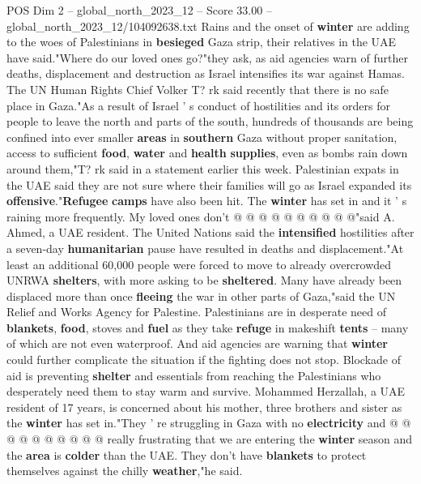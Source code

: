 \begin{textsample}{POS Dim 2 – global\_north\_2023\_12 – Score 33.00 – global\_north\_2023\_12/104092638.txt}  \label{ex:f2_pos_116}
Rains and the onset of \textbf{winter} are adding to the woes of Palestinians in \textbf{besieged} Gaza strip, their relatives in the UAE have said."Where do our loved ones go?"they ask, as aid agencies warn of further deaths, displacement and destruction as Israel intensifies its war against Hamas.
The UN Human Rights Chief Volker T? rk said recently that there is no safe place in Gaza."As a result of Israel ' s conduct of hostilities and its orders for people to leave the north and parts of the south, hundreds of thousands are being confined into ever smaller \textbf{areas} in \textbf{southern} Gaza without proper sanitation, access to sufficient \textbf{food}, \textbf{water} and \textbf{health} \textbf{supplies}, even as bombs rain down around them,"T? rk said in a statement earlier this week.
Palestinian expats in the UAE said they are not sure where their families will go as Israel expanded its \textbf{offensive}."\textbf{Refugee} \textbf{camps} have also been hit.
The \textbf{winter} has set in and it ' s raining more frequently.
My loved ones don't @ @ @ @ @ @ @ @ @ @"said A.
Ahmed, a UAE resident.
The United Nations said the \textbf{intensified} hostilities after a seven-day \textbf{humanitarian} pause have resulted in deaths and displacement."At least an additional 60,000 people were forced to move to already overcrowded UNRWA \textbf{shelters}, with more asking to be \textbf{sheltered}.
Many have already been displaced more than once \textbf{fleeing} the war in other parts of Gaza,"said the UN Relief and Works Agency for Palestine.
Palestinians are in desperate need of \textbf{blankets}, \textbf{food}, stoves and \textbf{fuel} as they take \textbf{refuge} in makeshift \textbf{tents} -- many of which are not even waterproof.
And aid agencies are warning that \textbf{winter} could further complicate the situation if the fighting does not stop.
Blockade of aid is preventing \textbf{shelter} and essentials from reaching the Palestinians who desperately need them to stay warm and survive.
Mohammed Herzallah, a UAE resident of 17 years, is concerned about his mother, three brothers and sister as the \textbf{winter} has set in."They ' re struggling in Gaza with no \textbf{electricity} and @ @ @ @ @ @ @ @ @ @ really frustrating that we are entering the \textbf{winter} season and the \textbf{area} is \textbf{colder} than the UAE.
They don't have \textbf{blankets} to protect themselves against the chilly \textbf{weather},"he said.

\end{textsample}
